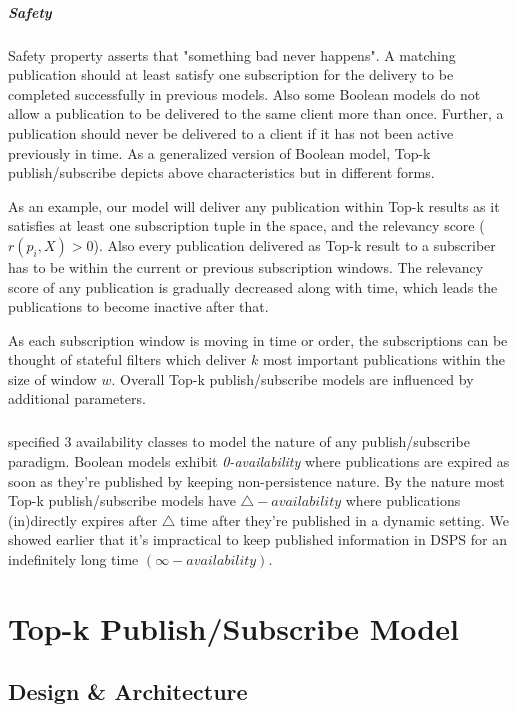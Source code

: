 \documentclass[a4paper,12pt,oneside]{book}
\theoremstyle{definition}
\theoremstyle{remark}
\begin{document}
\paragraph*{Safety}
Safety property asserts that "something bad never happens". A matching publication should at least satisfy one subscription for the delivery to be completed successfully in previous models. Also some Boolean models do not allow a publication to be delivered to the same client more than once. Further, a publication should never be delivered to a client if it has not been active previously in time. As a generalized version of Boolean model, Top-k publish/subscribe depicts above characteristics but in different forms.

As an example, our model will deliver any publication within Top-k results as it satisfies at least one subscription tuple in the space, and the relevancy score ($r(p_i,X)>0$). Also every publication delivered as Top-k result to a subscriber has to be within the current or previous subscription windows. The relevancy score of any publication is gradually decreased along with time, which leads the publications to become inactive after that. 

As each subscription window is moving in time or order, the subscriptions can be thought of stateful filters which deliver $k$ most important publications within the size of window $w$. Overall Top-k publish/subscribe models are influenced by additional parameters.

\paragraph*{}
\cite{Baldoni2003} specified 3 availability classes to model the nature of any publish/subscribe paradigm. Boolean models exhibit \emph{0-availability} where publications are expired as soon as they're published by keeping non-persistence nature. By the nature most Top-k publish/subscribe models have $\bigtriangleup-availability$ where publications (in)directly expires after $\bigtriangleup$ time after they're published in a dynamic setting. We showed earlier that it's impractical to keep published information in \ac{DSPS} for an indefinitely long time $(\infty-availability)$.    


\chapter{Top-k Publish/Subscribe Model}
\label{design}
\section{Design \& Architecture}
\end{document}
